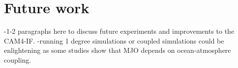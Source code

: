 \documentclass[letterpaper,12pt,titlepage,oneside,final]{book}
\let\origdoublepage\cleardoublepage
\newcommand{\clearemptydoublepage}{%
  \clearpage{\pagestyle{empty}\origdoublepage}}
\let\cleardoublepage\clearemptydoublepage
\begin{document}
\section{Future work}
-1-2 paragraphs here to discuss future experiments and improvements to the CAM4-IF.
-running 1 degree simulations or coupled simulations could be enlightening as some studies show that MJO depends on ocean-atmosphere coupling.




\cleardoublepage %
\renewcommand*{\bibname}{References}

%



\appendix

\end{document}
